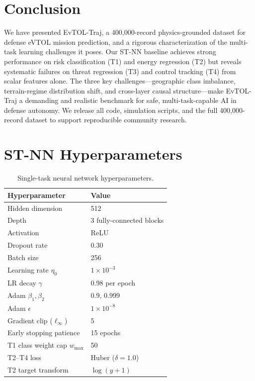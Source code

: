 \documentclass{article}
\theoremstyle{plain}
\theoremstyle{definition}
\begin{document}
\section{Conclusion}
\label{sec:conclusion}

We have presented EvTOL-Traj, a 400{,}000-record physics-grounded dataset
for defense eVTOL mission prediction, and a rigorous characterization of
the multi-task learning challenges it poses.
Our ST-NN baseline achieves strong performance on risk classification (T1)
and energy regression (T2) but reveals systematic failures on threat
regression (T3) and control tracking (T4) from scalar features alone.
The three key challenges---geographic class imbalance, terrain-regime
distribution shift, and cross-layer causal structure---make EvTOL-Traj
a demanding and realistic benchmark for safe, multi-task-capable AI in
defense autonomy.
We release all code, simulation scripts, and the full 400{,}000-record
dataset to support reproducible community research.




\newpage
\appendix
\onecolumn

\section{ST-NN Hyperparameters}
\label{app:hyperparams}

\begin{table}[h]
\centering
\caption{Single-task neural network hyperparameters.}
\begin{tabular}{ll}
\toprule
Hyperparameter & Value \\
\midrule
Hidden dimension & 512 \\
Depth & 3 fully-connected blocks \\
Activation & ReLU \\
Dropout rate & 0.30 \\
Batch size & 256 \\
Learning rate $\eta_0$ & $1 \times 10^{-3}$ \\
LR decay $\gamma$ & 0.98 per epoch \\
Adam $\beta_1, \beta_2$ & 0.9, 0.999 \\
Adam $\epsilon$ & $1 \times 10^{-8}$ \\
Gradient clip ($\ell_\infty$) & 5 \\
Early stopping patience & 15 epochs \\
T1 class weight cap $w_{\max}$ & 50 \\
T2--T4 loss & Huber ($\delta = 1.0$) \\
T2 target transform & $\log(y + 1)$ \\
\bottomrule
\end{tabular}
\end{table}
\end{document}
